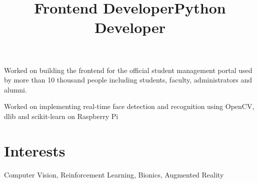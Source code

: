 \documentclass[margin]{res}
\begin{document}
\begin{resume}
      \title{\textbf{Frontend Developer}}
      \begin{position}
        Worked on building the frontend for the official student management portal used by more than 10 thousand people including students, faculty, administrators and alumni.
      \end{position}

      \title{\textbf{Python Developer}}
      \begin{position}
        Worked on implementing real-time face detection and recognition using OpenCV, dlib and scikit-learn on Raspberry Pi
      \end{position}

    \section{Interests}
      Computer Vision, Reinforcement Learning, Bionics, Augmented Reality
  \end{resume}
\end{document}
